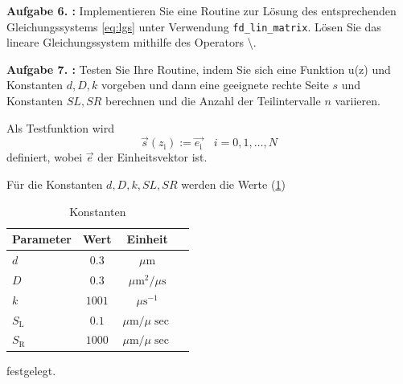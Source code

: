 \begin{figure}[htb]
	
\end{figure}

\clearpage
\begin{mybox}
	\textbf{Aufgabe 6. :} 
	Implementieren Sie eine Routine zur Lösung des entsprechenden Gleichungssystems \cref{eq:lgs} unter Verwendung
\verb*|fd_lin_matrix|. Lösen Sie das lineare Gleichungssystem mithilfe des Operators \textbackslash .
\end{mybox}


\begin{figure}[htb]
	
	\end{figure}

\begin{mybox}
	\textbf{Aufgabe 7. :} Testen Sie Ihre Routine, indem Sie sich eine Funktion u(z) und Konstanten $d, D, k$ vorgeben und
	dann eine geeignete rechte Seite $s$ und Konstanten $SL, SR$ berechnen und die Anzahl der Teilintervalle
	$n$ variieren.
\end{mybox}
Als Testfunktion wird
\begin{equation}
	\vec{s}(z_\mathrm{i}):=\vec{e_\mathrm{i}}\quad i=0,1,\dots,N
\end{equation}
definiert, wobei $\vec{e}$ der Einheitsvektor ist.

Für die Konstanten  $d, D, k, SL, SR$ werden die Werte (\cref{t:const})
\begin{table}
	\centering
	\caption{Konstanten}
	\label{t:const}
	\begin{tabular}{lccc}
		\toprule
		
		Parameter& Wert &Einheit   \\
		\midrule
		$d$	& $0.3$ & $\si{\mu\meter}$    \\
		
		$D$ & $0.3$	&  $\si{\mu\square\m\per \mu \s}$  \\
		
		$k$ & $1001$	& $\si{\mu\second^{-1}}$  \\
		
		$S_\mathrm{L}$ 	& $0.1$ & $\si{\mu\m\per\mu\sec}$ \\
		
		$S_\mathrm{R}$ 	&$1000$ &  $\si{\mu\m\per\mu\sec}$  \\
		\bottomrule
		
	\end{tabular}
	
\end{table} 
festgelegt.

